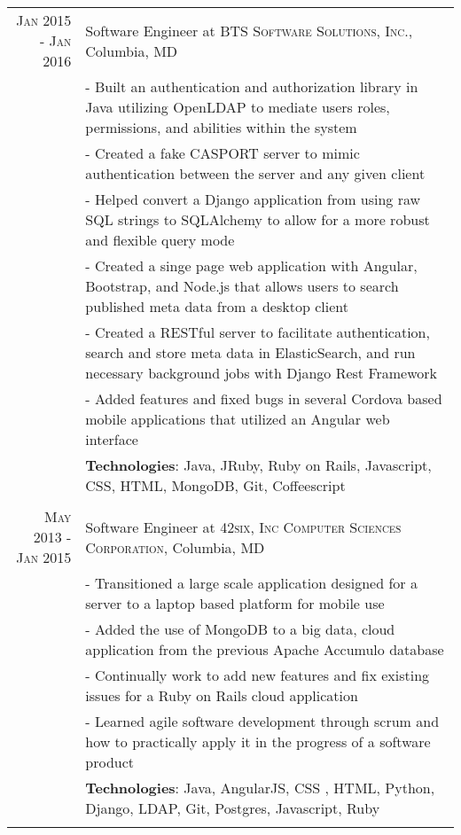 \documentclass[a4paper,10pt]{article} %
\begin{document}
\begin{tabular}{r|p{11cm}}
\textsc{Jan 2015 - Jan 2016} & Software Engineer at \textsc{BTS Software Solutions, Inc.}, Columbia, MD \\
& \footnotesize{- Built an authentication and authorization library in Java utilizing OpenLDAP to mediate users roles, permissions, and abilities within the system}\\
& \footnotesize{- Created a fake CASPORT server to mimic authentication between the server and any given client}\\
& \footnotesize{- Helped convert a Django application from using raw SQL strings to SQLAlchemy to allow for a more robust and flexible query mode}\\
& \footnotesize{- Created a singe page web application with Angular, Bootstrap, and Node.js that allows users to search published meta data from a desktop client}\\
& \footnotesize{- Created a RESTful server to facilitate authentication, search and store meta data in ElasticSearch, and run necessary background jobs with Django Rest Framework}\\
& \footnotesize{- Added features and fixed bugs in several Cordova based mobile applications that utilized an Angular web interface}\\
& \footnotesize{\textbf{Technologies}: Java, JRuby, Ruby on Rails, Javascript, CSS, HTML, MongoDB, Git, Coffeescript }\\
\multicolumn{2}{c}{} \\


\textsc{May 2013 - Jan 2015} & Software Engineer at \textsc{42six, Inc Computer Sciences Corporation}, Columbia, MD \\
& \footnotesize{- Transitioned a large scale application designed for a server to a laptop based platform for mobile use}\\
& \footnotesize{- Added the use of MongoDB to a big data, cloud application from the previous Apache Accumulo database}\\
& \footnotesize{- Continually work to add new features and fix existing issues for a Ruby on Rails cloud application}\\
& \footnotesize{- Learned agile software development through scrum and how to practically apply it in the progress of a software product}\\
& \footnotesize{\textbf{Technologies}: Java, AngularJS, CSS , HTML, Python, Django, LDAP, Git, Postgres, Javascript, Ruby}\\
\multicolumn{2}{c}{} \\

\end{tabular}
\end{document}
